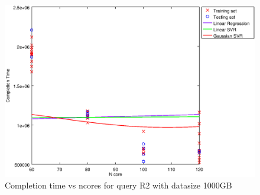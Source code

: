 
\begin {figure}[hbtp]
\centering
\includegraphics[width=\textwidth]{output/R2_1000_LINEAR_NCORE/plot_R2_1000_bestmodels.eps}
\caption{Completion time vs ncores for query R2 with datasize 1000GB}
\label{fig:coreonly_linear_R2_1000}
\end {figure}
